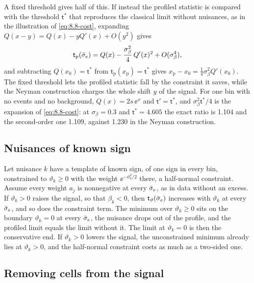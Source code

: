A fixed threshold gives half of this. If instead the profiled statistic is compared with the threshold $\mathsf{t}^*$ that reproduces the classical limit without nuisances, as in the illustration of \cref{eq:8.8-cost}, expanding $Q(x - y) = Q(x) - yQ'(x) + O(y^2)$ gives
\begin{equation*}
  \mathsf{t}_{\mathrm{p}}(\bar{\sigma}_{e}) = Q(x) - \frac{\sigma_\beta^2}{4}\,Q'(x)^2 + O(\sigma_\beta^4) ,
\end{equation*}
and subtracting $Q(x_0) = \mathsf{t}^*$ from $\mathsf{t}_{\mathrm{p}}(x_{\mathrm{p}}) = \mathsf{t}^*$ gives $x_{\mathrm{p}} - x_0 = \tfrac14\sigma_\beta^2Q'(x_0)$. The fixed threshold lets the profiled statistic fall by the constraint it saves, while the Neyman construction charges the whole shift $y$ of the signal. For one bin with no events and no background, $Q(x) = 2s\,\ee^x$ and $\mathsf{t}' = \mathsf{t}^*$, and $\sigma_\beta^2\mathsf{t}^*/4$ is the expansion of \cref{eq:8.8-cost}: at $\sigma_\beta = 0.3$ and $\mathsf{t}^* = 4.605$ the exact ratio is 1.104 and the second-order one 1.109, against 1.230 in the Neyman construction.

\subsection{Nuisances of known sign}

Let nuisance $k$ have a template of known sign, of one sign in every bin, constrained to $\vartheta_k \ge 0$ with the weight $\ee^{-\vartheta_k^2/2}$ there, a half-normal constraint. Assume every weight $a_j$ is nonnegative at every $\bar{\sigma}_{e}$, as in data without an excess. If $\vartheta_k > 0$ raises the signal, so that $\beta_k < 0$, then $\mathsf{t}_\vartheta(\bar{\sigma}_{e})$ increases with $\vartheta_k$ at every $\bar{\sigma}_{e}$, and so does the constraint term. The minimum over $\vartheta_k \ge 0$ sits on the boundary $\vartheta_k = 0$ at every $\bar{\sigma}_{e}$, the nuisance drops out of the profile, and the profiled limit equals the limit without it. The limit at $\vartheta_k = 0$ is then the conservative end. If $\vartheta_k > 0$ lowers the signal, the unconstrained minimum already lies at $\vartheta_k > 0$, and the half-normal constraint costs as much as a two-sided one.

\subsection{Removing cells from the signal}

